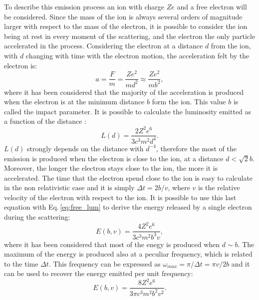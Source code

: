 \documentclass[../main.tex]{subfiles}
\begin{document}
To describe this emission process an ion with charge $Ze$ and a free electron will be considered.
Since the mass of the ion is always several orders of magnitude larger with respect to the mass of the electron, it is possible to consider the ion being at rest in every moment of the scattering, and the electron the only particle accelerated in the process.
Considering the electron at a distance $d$ from the ion, with $d$ changing with time with the electron motion, the acceleration felt by the electron is:
\begin{equation}
    \label{eq:acceleration}
    a = \frac{F}{m} = \frac{Ze^2}{md^2}\approx \frac{Ze^2}{mb^2},
\end{equation}
where it has been considered that the majority of the acceleration is produced when the electron is at the minimum distance $b$ form the ion.
This value $b$ is called the impact parameter.
It is possible to calculate the luminosity emitted as a function of the distance \citep{Deyoung02}:
\begin{equation}
    \label{eq:free_lum}
    L(d) = \frac{2Z^2e^6}{3c^3m^2d^4}.
\end{equation}
$L(d)$ strongly depends on the distance with $d^{-4}$, therefore the most of the emission is produced when the electron is close to the ion, at a distance $d<\sqrt{2}b$.
Moreover, the longer the electron stays close to the ion, the more it is accelerated.
The time that the electron spend close to the ion is easy to calculate in the non relativistic case and it is simply $\Delta t = 2b/v$, where $v$ is the relative velocity of the electron with respect to the ion.
It is possible to use this last equation with Eq.\,\ref{eq:free_lum} to derive the energy released by a single electron during the scattering:
\begin{equation}
    \label{eq:free_energy}
    E(b,v) = \frac{4Z^2e^6}{3c^3m^2b^3v},
\end{equation}
where it has been considered that most of the enegy is produced when $d\sim b$.
The maximum of the energy is produced also at a peculiar frequency, which is related to the time $\Delta t$.
This frequency can be expressed as $\omega_{max} = \pi/\Delta t = \pi v/2b$ and it can be used to recover the energy emitted per unit frequency:
\begin{equation}
    \label{eq:free_energy_freq}
    E(b,v) = \frac{8Z^2e^6}{3\pi c^3m^2b^2v^2}.
\end{equation}
\end{document}

